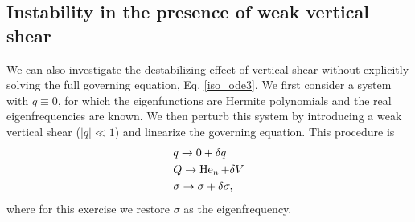 
\subsection{Instability in the presence of weak vertical shear}
We can also investigate the destabilizing effect of vertical shear
without explicitly solving the full governing equation,
Eq. \ref{iso_ode3}. We first
consider a system with $q\equiv0$, for which the eigenfunctions are
Hermite polynomials and the real eigenfrequencies are known. We then
perturb this system by introducing a weak vertical shear ($|q|\ll1$)
and linearize the governing equation. This procedure is
\begin{align}   
  &q \to 0 + \delta q\\
  &Q \to \operatorname{He}_n + \delta V \\
  &\sigma \to \sigma + \delta\sigma, 
\end{align}
where for this exercise we restore $\sigma$ as the eigenfrequency. 

